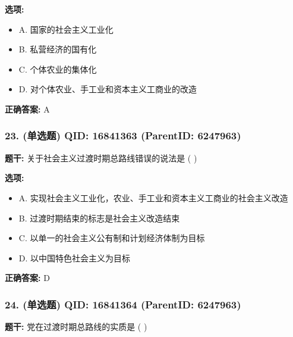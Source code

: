 \documentclass[12pt,UTF8]{ctexart}
\begin{document}
\textbf{选项:}
\begin{itemize}[leftmargin=*]

  \item A. 国家的社会主义工业化

  \item B. 私营经济的国有化

  \item C. 个体农业的集体化

  \item D. 对个体农业、手工业和资本主义工商业的改造

\end{itemize}

\textbf{正确答案:}
A

\vspace{0.3em}\hrulefill\vspace{0.7em}

\subsubsection*{23. (单选题) \small QID: 16841363 (ParentID: 6247963)}

\textbf{题干:}
关于社会主义过渡时期总路线错误的说法是 ( )



\textbf{选项:}
\begin{itemize}[leftmargin=*]

  \item A. 实现社会主义工业化，农业、手工业和资本主义工商业的社会主义改造

  \item B. 过渡时期结束的标志是社会主义改造结束

  \item C. 以单一的社会主义公有制和计划经济体制为目标

  \item D. 以中国特色社会主义为目标

\end{itemize}

\textbf{正确答案:}
D

\vspace{0.3em}\hrulefill\vspace{0.7em}

\subsubsection*{24. (单选题) \small QID: 16841364 (ParentID: 6247963)}

\textbf{题干:}
党在过渡时期总路线的实质是 ( )
\end{document}
